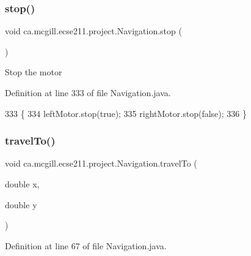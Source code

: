 \subsubsection{\texorpdfstring{stop()}{stop()}}
{\footnotesize\ttfamily void ca.\+mcgill.\+ecse211.\+project.\+Navigation.\+stop (\begin{DoxyParamCaption}{ }\end{DoxyParamCaption})}

Stop the motor 

Definition at line 333 of file Navigation.\+java.


\begin{DoxyCode}
333                      \{
334     leftMotor.stop(\textcolor{keyword}{true});
335     rightMotor.stop(\textcolor{keyword}{false});
336   \}
\end{DoxyCode}
\mbox{\label{classca_1_1mcgill_1_1ecse211_1_1project_1_1_navigation_ad89b3dd084d81b4ec4d89ea73ba13eaa}} 
\subsubsection{\texorpdfstring{travel\+To()}{travelTo()}}
{\footnotesize\ttfamily void ca.\+mcgill.\+ecse211.\+project.\+Navigation.\+travel\+To (\begin{DoxyParamCaption}\item[{double}]{x,  }\item[{double}]{y }\end{DoxyParamCaption})}



Definition at line 67 of file Navigation.\+java.


